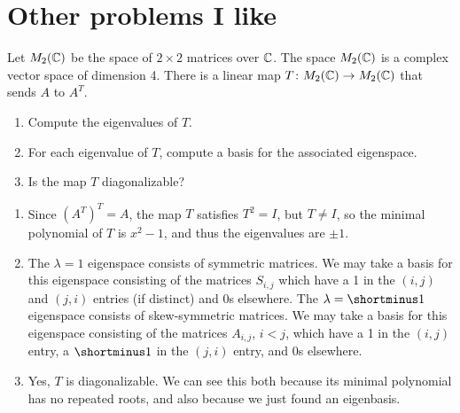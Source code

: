 \section{Other problems I like}

\begin{question}[subtitle= {From a Purdue qual},ID=PuLA_Aug23]
Let $M_2(\mathbb{C})$ be the space of $2 \times 2$ matrices over $\mathbb{C}$. The space $M_2(\mathbb{C})$ is a complex vector space of dimension 4. There is a linear map $T\colon M_2(\mathbb{C}) \to M_2(\mathbb{C})$ that sends $A$ to $A^T$.
\begin{enumerate}
    \item Compute the eigenvalues of $T$.
    \item For each eigenvalue of $T$, compute a basis for the associated eigenspace.
    \item Is the map $T$ diagonalizable?
\end{enumerate}
\end{question}
\begin{solution}
\begin{enumerate}
    \item Since $(A^T)^T = A$, the map $T$ satisfies $T^2 = I$, but $T \neq I$, so the minimal polynomial of $T$ is $x^2 - 1$, and thus the eigenvalues are $\pm 1$.
    \item The $\lambda = 1$ eigenspace consists of symmetric matrices. We may take a basis for this eigenspace consisting of the matrices $S_{i,j}$ which have a 1 in the $(i,j)$ and $(j,i)$ entries (if distinct) and 0s elsewhere. The $\lambda = \shortminus 1$ eigenspace consists of skew-symmetric matrices. We may take a basis for this eigenspace consisting of the matrices $A_{i,j}$, $i < j$, which have a 1 in the $(i,j)$ entry, a $\shortminus 1$ in the $(j,i)$ entry, and 0s elsewhere.
    \item Yes, $T$ is diagonalizable. We can see this both because its minimal polynomial has no repeated roots, and also because we just found an eigenbasis.
\end{enumerate}
\end{solution}

